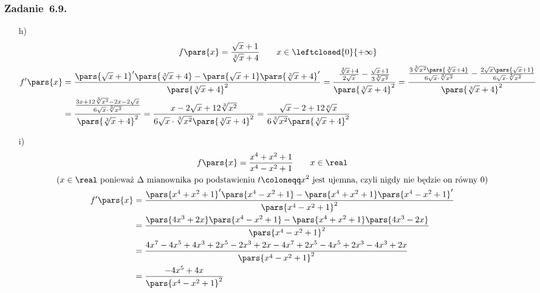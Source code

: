 \subsubsection*{Zadanie~6.9.}
\begin{itemize}
    \item[h)]
        \begin{gather*}
            f\pars{x} = \frac{\sqrt{x} + 1}{\sqrt[3]{x} + 4} \qquad x \in \leftclosed{0}{+\infty}\\
            \begin{split}
                f'\pars{x}
                    &= \frac{\pars{\sqrt{x} + 1}'\pars{\sqrt[3]{x} + 4} - \pars{\sqrt{x} + 1}\pars{\sqrt[3]{x} + 4}'}{\pars{\sqrt[3]{x} + 4}^2}
                    = \frac{\frac{\sqrt[3]{x} + 4}{2\sqrt{x}} - \frac{\sqrt{x} + 1}{3\sqrt[3]{x^2}}}{\pars{\sqrt[3]{x} + 4}^2}
                    = \frac{\frac{3\sqrt[3]{x^2}\pars{\sqrt[3]{x} + 4}}{6\sqrt{x} \cdot \sqrt[3]{x^2}} - \frac{2\sqrt{x}\pars{\sqrt{x} + 1}}{6\sqrt{x} \cdot \sqrt[3]{x^2}}}{\pars{\sqrt[3]{x} + 4}^2}\\
                    &= \frac{\frac{3x + 12\sqrt[3]{x^2} - 2x - 2\sqrt{x}}{6\sqrt{x} \cdot \sqrt[3]{x^2}}}{\pars{\sqrt[3]{x} + 4}^2}
                    = \frac{x - 2\sqrt{x} + 12\sqrt[3]{x^2}}{6\sqrt{x} \cdot \sqrt[3]{x^2}\pars{\sqrt[3]{x} + 4}^2}
                    = \frac{\sqrt{x} - 2 + 12\sqrt[6]{x}}{6\sqrt[3]{x^2}\pars{\sqrt[3]{x} + 4}^2}
            \end{split}
        \end{gather*}
    \item[i)]
        \begin{gather*}
            f\pars{x} = \frac{x^4 + x^2 + 1}{x^4 - x^2 + 1} \qquad x \in \real\\
            \text{(\(x \in \real\) ponieważ \(\Delta\) mianownika po podstawieniu \(t \coloneqq x^2\) jest ujemna, czyli nigdy nie będzie on równy \(0\))}\\
            \begin{split}
                f'\pars{x}
                    &= \frac{\pars{x^4 + x^2 + 1}'\pars{x^4 - x^2 + 1} - \pars{x^4 + x^2 + 1}\pars{x^4 - x^2 + 1}'}{\pars{x^4 - x^2 + 1}^2}\\
                    &= \frac{\pars{4x^3 + 2x}\pars{x^4 - x^2 + 1} - \pars{x^4 + x^2 + 1}\pars{4x^3 - 2x}}{\pars{x^4 - x^2 + 1}^2}\\
                    &= \frac{4x^7 - 4x^5 + 4x^3 + 2x^5 - 2x^3 + 2x - 4x^7 + 2x^5 - 4x^5 + 2x^3 - 4x^3 + 2x}{\pars{x^4 - x^2 + 1}^2}\\
                    &= \frac{-4x^5 + 4x}{\pars{x^4 - x^2 + 1}^2}
            \end{split}
        \end{gather*}
\end{itemize}
